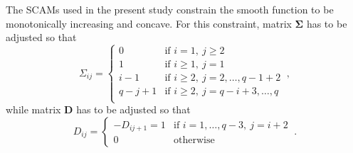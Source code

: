 The SCAMs used in the present study constrain the smooth function to be monotonically increasing and concave.  For this constraint, matrix \(\symbf{\Sigma}\) has to be adjusted so that
\begin{equation}
  \label{eq:SCAMAdjustedSigma}
  \Sigma_{i j} =
  \begin{cases}
    0 &\text{if } i = 1,~ j \geq 2 \\
    1 &\text{if } i \geq 1,~ j = 1 \\
    i - 1 &\text{if } i \geq 2,~ j = 2, \ldots, q - 1 + 2 \\
    q - j + 1 &\text{if } i \geq 2,~ j = q - i + 3, \ldots, q\\
  \end{cases}~,
\end{equation}
while matrix \(\symbf{D}\) has to be adjusted so that
\begin{equation}
  \label{eq:SCAMAdjustedD}
  D_{i j} = 
  \begin{cases}
    - D_{i j + 1} = 1 &\text{if } i = 1, \ldots, q - 3,~ j = i + 2 \\
    0 &\text{otherwise}
  \end{cases}~.
\end{equation}

